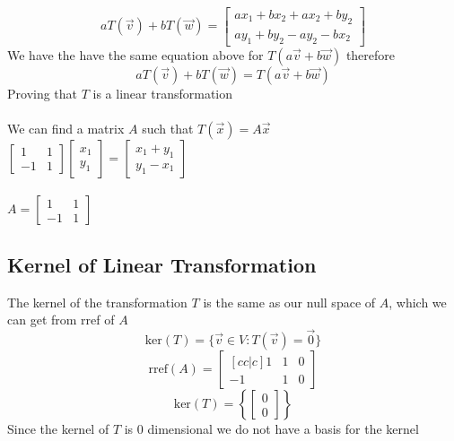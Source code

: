 \documentclass[12pt]{article}
\begin{document}
 \begin{equation*}
 aT(\vec{v}) + bT(\vec{w}) = \begin{bmatrix}ax_1 + bx_2+ax_2+by_2 \\ ay_1+by_2 - ay_2-bx_2\end{bmatrix}
\end{equation*}
We have the have the same equation above for $T(a\vec{v}+b\vec{w})$ therefore 
 \begin{equation*}
 aT(\vec{v}) + bT(\vec{w}) = T(a\vec{v}+b\vec{w})
\end{equation*}
Proving that $T$ is a linear transformation\\\\
We can find a matrix $A$ such that $T(\vec{x}) = A\vec{x}$
\\$\begin{bmatrix} 1 & 1 \\ -1 & 1\end{bmatrix}\begin{bmatrix}x_1 \\ y_1\end{bmatrix} =\begin{bmatrix}x_1+y_1 \\ y_1-x_1\end{bmatrix} $
\\\\ $A = \begin{bmatrix}1 & 1 \\ -1 & 1 \end{bmatrix}$
\subsection{Kernel of Linear Transformation}
The kernel of the transformation $T$ is the same as our null space of $A$, which we can get from rref of $A$
\begin{equation*}\text{ker}(T) = \{\vec{v} \in V : T(\vec{v}) = \vec{0}\}\end{equation*}
\begin{equation*}\text{rref}(A)=\begin{bmatrix}[cc|c] 1 & 1 & 0 \\ -1 & 1 & 0\end{bmatrix} \end{equation*}
\begin{equation*}\text{ker}(T) = \left\{\begin{bmatrix}0 \\ 0\end{bmatrix}\right\}\end{equation*}Since the kernel of $T$ is 0 dimensional we do not have a basis for the kernel
\end{document}
